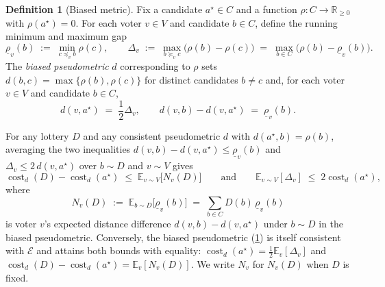 \documentclass[11pt]{article}
\numberwithin{equation}{section}
\theoremstyle{plain}
\theoremstyle{definition}
\newtheorem{definition}[theorem]{Definition}
\newcommand{\E}{\mathbb{E}}
\newcommand{\R}{\mathbb{R}}
\newcommand{\1}{\mathbf{1}}
\newcommand{\lowrho}{\underline{\rho}}
\newcommand{\cost}{\operatorname{cost}}
\newcommand{\calE}{\mathcal{E}}
\begin{document}
\begin{definition}[Biased metric]
\label{def:biased-metric}
Fix a candidate $a^\star \in C$ and a function $\rho \colon C \to \R_{\ge 0}$ with $\rho(a^\star) = 0$. For each voter $v \in V$ and candidate $b \in C$, define the running minimum and maximum gap
\[
  \lowrho_v(b) \;:=\; \min_{c \preceq_v b} \rho(c),
  \qquad
  \Delta_v \;:=\; \max_{b \succeq_v c}\bigl(\rho(b) - \rho(c)\bigr) \;=\; \max_{b \in C}\bigl(\rho(b) - \lowrho_v(b)\bigr).
\]
The \emph{biased pseudometric} $d$ corresponding to $\rho$ sets $d(b, c) = \max\{\rho(b), \rho(c)\}$ for distinct candidates $b \ne c$ and, for each voter $v \in V$ and candidate $b \in C$,
\[
  d(v, a^\star) \;=\; \frac{1}{2}\Delta_v,
  \qquad
  d(v, b) - d(v, a^\star) \;=\; \lowrho_v(b).
\]
\end{definition}

For any lottery $D$ and any consistent pseudometric $d$ with $d(a^\star, b) = \rho(b)$, averaging the two inequalities $d(v, b) - d(v, a^\star) \le \lowrho_v(b)$ and $\Delta_v \le 2\,d(v, a^\star)$ over $b \sim D$ and $v \sim V$ gives
\[
  \cost_d(D) - \cost_d(a^\star) \;\le\; \E_{v \sim V}\bigl[N_v(D)\bigr]
  \qquad\text{and}\qquad
  \E_{v \sim V}[\Delta_v] \;\le\; 2\cost_d(a^\star),
\]
where
\[
  N_v(D) \;:=\; \E_{b \sim D}\bigl[\lowrho_v(b)\bigr] \;=\; \sum_{b \in C} D(b)\,\lowrho_v(b)
\]
is voter $v$'s expected distance difference $d(v, b) - d(v, a^\star)$ under $b \sim D$ in the biased pseudometric. Conversely, the biased pseudometric (\cref{def:biased-metric}) is itself consistent with $\calE$ and attains both bounds with equality: $\cost_d(a^\star) = \frac{1}{2}\E_v[\Delta_v]$ and $\cost_d(D) - \cost_d(a^\star) = \E_v[N_v(D)]$. We write $N_v$ for $N_v(D)$ when $D$ is fixed.
\end{document}
